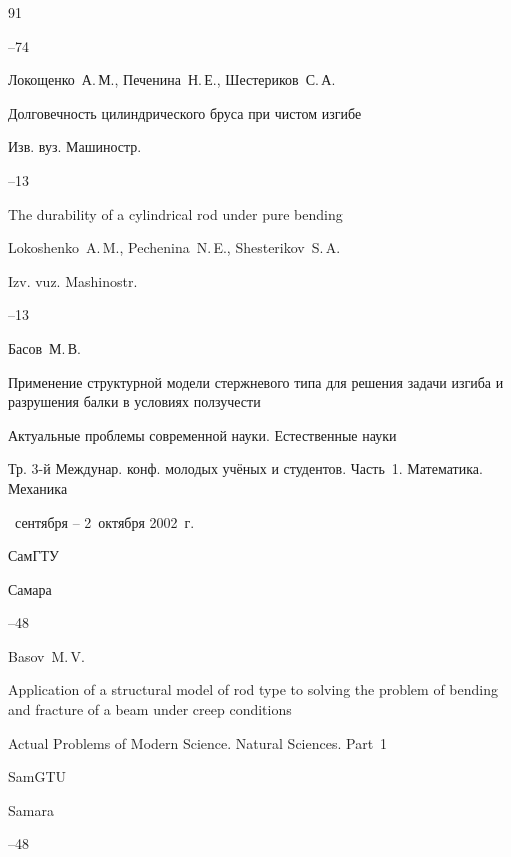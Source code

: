 \begin{thebibliography}{91}

--74




\by Локощенко~А.\,М., Печенина~Н.\,Е., Шестериков~С.\,А.

\paper Долговечность цилиндрического бруса при чистом изгибе

\jour Изв. вуз. Машиностр.



--13

\misctransl

\paper The durability of a cylindrical rod under pure bending

\by Lokoshenko~A.\,M., Pechenina~N.\,E., Shesterikov~S.\,A.

\jour Izv. vuz. Mashinostr.



--13




\by Басов~М.\,В.

\paper Применение структурной модели стержневого типа для решения задачи изгиба и разрушения балки в условиях ползучести

\inbook Актуальные проблемы современной науки. Естественные науки

\bookinfo Тр. 3-й Междунар. конф. молодых учёных и студентов.  Часть~1. Математика. Механика

~сентября -- 2~октября 2002~г.

\publ СамГТУ

\publaddr Самара


--48

\misctransl

\by Basov~M.\,V.

\paper Application of a structural model of rod type to solving the problem of bending and fracture of a beam under creep conditions

\inbook Actual Problems of Modern Science. Natural Sciences. \rm Part~1

\publ SamGTU

\publaddr Samara


--48






\end{thebibliography}
